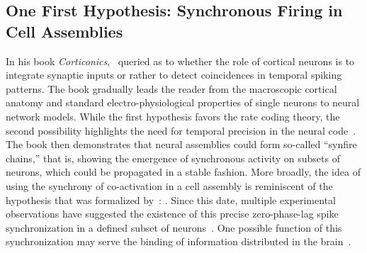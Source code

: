 \documentclass[brainsci, %
               review,accept,pdftex,moreauthors
               ]{Definitions/mdpi}
\begin{document}
\subsection{One First Hypothesis: Synchronous Firing in Cell Assemblies}
%
In his book \emph{Corticonics},~\citet{abeles_corticonics_1991} queried as to whether the role of cortical neurons is to integrate synaptic inputs or rather to detect coincidences in temporal spiking patterns. The book gradually leads the reader from the macroscopic cortical anatomy and standard electro-physiological properties of single neurons to neural network models. While the first hypothesis favors the rate coding theory, the second possibility highlights the need for temporal precision in the neural code~\citep{abeles_role_1982,paugam-moisy_computing_2012}. The book then demonstrates that neural assemblies could form so-called ``synfire chains,'' that is, showing the emergence of synchronous activity on subsets of neurons, which could be propagated in a stable fashion. More broadly, the idea of using the synchrony of co-activation in a cell assembly is reminiscent of the hypothesis that was formalized by~\citet{hebb_organization_1949}: . Since this date, multiple experimental observations have suggested the existence of this precise zero-phase-lag spike synchronization in a defined subset of neurons~\citep{harris_organization_2003}. One possible function of this synchronization may serve the binding of information distributed in the brain~\citep{singer_visual_1995, roelfsema_visuomotor_1997}.
\end{document}
